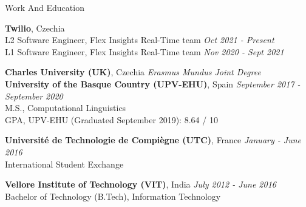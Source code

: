 \documentclass{resume} %
\begin{document}


    
\begin{rSection}{Work And Education}

    {\textbf{Twilio}, Czechia}\\
            L2 Software Engineer, Flex Insights Real-Time team \hfill \textit{Oct 2021 - Present}\\
            L1 Software Engineer, Flex Insights Real-Time team \hfill \textit{Nov 2020 - Sept 2021}
    
    {\textbf{Charles University (UK)}, Czechia} \hfill
        {\em Erasmus Mundus Joint Degree}\\
    {\textbf{University of the Basque Country (UPV-EHU)}, Spain} \hfill
        {\textit{September 2017 - September 2020}}\\
            M.S., Computational Linguistics\\
            GPA, UPV-EHU (Graduated September 2019): 8.64 / 10%
    
    {\textbf{Universit\'e de Technologie de Compi\`egne (UTC)}, France} \hfill
        {\textit{January - June 2016}}\\
            International Student Exchange
    
    {\textbf{Vellore Institute of Technology (VIT)}, India} \hfill
        {\textit{July 2012 - June 2016}}\\
            Bachelor of Technology (B.Tech), Information Technology

\end{rSection}


\end{document}
